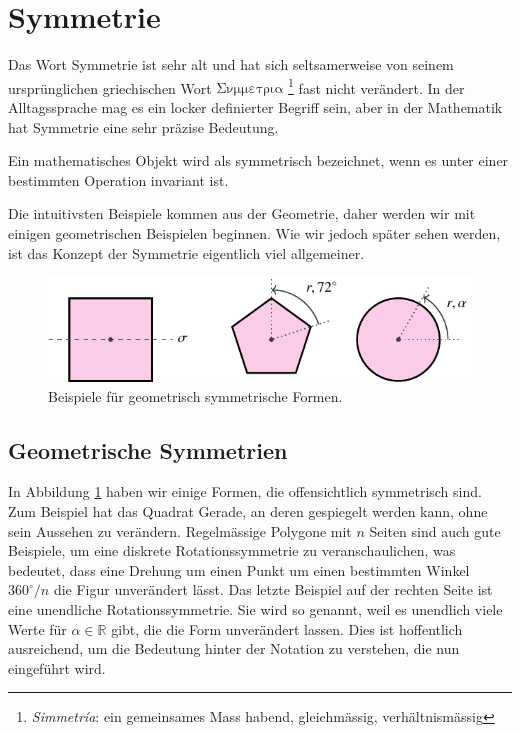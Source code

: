 \section{Symmetrie}
Das Wort Symmetrie ist sehr alt und hat sich seltsamerweise von seinem
ursprünglichen griechischen Wort
\(\mathrm{\Sigma\nu\mu\mu\varepsilon\tau\rho\iota\alpha}\)
\footnote{\emph{Simmetr\'ia}: ein gemeinsames Mass habend, gleichmässig,
verhältnismässig} fast nicht verändert. In der Alltagssprache mag es ein
locker definierter Begriff sein, aber in der Mathematik hat Symmetrie eine sehr
präzise Bedeutung.
\begin{definition}[Symmetrie]
	Ein mathematisches Objekt wird als symmetrisch bezeichnet, wenn es unter einer
	bestimmten Operation invariant ist.
\end{definition}
Die intuitivsten Beispiele kommen aus der Geometrie, daher werden wir mit
einigen geometrischen Beispielen beginnen. Wie wir jedoch später sehen werden,
ist das Konzept der Symmetrie eigentlich viel allgemeiner.  

\begin{figure}
	\centering
	\includegraphics{papers/punktgruppen/figures/symmetric-shapes}
	\caption{
		Beispiele für geometrisch symmetrische Formen.
		\label{fig:punktgruppen:geometry-example}
	}
\end{figure}

\subsection{Geometrische Symmetrien}

In Abbildung \ref{fig:punktgruppen:geometry-example} haben wir einige Formen,
die offensichtlich symmetrisch sind.  Zum Beispiel hat das Quadrat Gerade, an
deren gespiegelt werden kann, ohne sein Aussehen zu verändern.  Regelmässige
Polygone mit \(n\) Seiten sind auch gute Beispiele, um eine diskrete
Rotationssymmetrie zu veranschaulichen, was bedeutet, dass eine Drehung um
einen Punkt um einen bestimmten Winkel \(360^\circ/n\) die Figur unverändert
lässt.  Das letzte Beispiel auf der rechten Seite ist eine unendliche
Rotationssymmetrie. Sie wird so genannt, weil es unendlich viele Werte für
\(\alpha \in \mathbb{R}\) gibt, die die Form unverändert lassen.  Dies ist
hoffentlich ausreichend, um die Bedeutung hinter der Notation zu verstehen, die
nun eingeführt wird.

